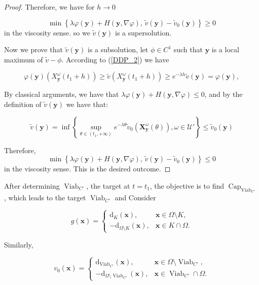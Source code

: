 \documentclass[]{interact}
\theoremstyle{plain}%
\theoremstyle{definition}
\theoremstyle{remark}
\begin{document}
\begin{proof}
Therefore, we have for $h \rightarrow 0$

\[ \min \left\{ \lambda \varphi(\mathbf{y}) + H(\mathbf{y}, \nabla \varphi), \, \tilde{v}(\mathbf{y}) - \tilde{v}_{0}(\mathbf{y}) \right\} \geq 0\]
in the viscosity sense. so we $\tilde{v}(\mathbf{y}) $  is a supersolution.

Now we prove that $\tilde{v}(\mathbf{y}) $ is a subsolution, let  \( \phi \in C^1 \) such that  $ \mathbf{y}$ is a local maximum of \( \tilde v - \phi \). According to (\ref{DDP_2}) we have 

\begin{equation}
\varphi(\mathbf{y})(X_{\mathbf{y}}^{\omega}(t_{1}+ h) ) \geq \tilde{v}(X_{\mathbf{y}}^{\omega}(t_{1}+ h) ) \geq e^{-\lambda  h } \tilde{v}(\mathbf{y})= \varphi(\mathbf{y}),
\end{equation}

By classical arguments, we have that $\lambda \varphi(\mathbf{y}) + H(\mathbf{y}, \nabla \varphi) \leq 0$, and by the definition of $\tilde{v}(\mathbf{y}) $ we have that: 

\[   \tilde{v}(\mathbf{y}) = \inf\left\{ \sup_{\theta \in (t_{1}, +\infty)} e^{-\lambda \theta} \tilde{v}_0 \left(\mathbf{X}_{\mathbf{y}}^\omega(\theta)\right), \omega \in \mathcal{U'} \right\} \leq  \tilde{v}_{0}(\mathbf{y})\]

Therefore, 
\[ \min \left\{ \lambda \varphi(\mathbf{y}) + H(\mathbf{y}, \nabla \varphi), \, \tilde{v}(\mathbf{y}) - \tilde{v}_{0}(\mathbf{y}) \right\} \leq 0\] in the viscosity sense. This is the desired outcome.


\end{proof}


After determining \(\operatorname{Viab}_{C'}\), the target at \(t = t_{1}\), the objective is to find \(\operatorname{Cap}_{\operatorname{Viab}_{C'}}\), which leads to the target \(\operatorname{Viab}_{C'}\) and  Consider 



\begin{equation}\label{g}
g(\mathbf{x}) = 
\begin{cases} 
\mathrm{d}_{K}(\mathbf{x}), & \mathbf{x} \in \Omega \setminus K, \\ 
-\mathrm{d}_{\Omega \setminus K}(\mathbf{x}), & \mathbf{x} \in K \cap \Omega.
\end{cases}
\end{equation}

Similarly, 

\begin{equation}\label{v0}
v_{0}(\mathbf{x}) = 
\begin{cases} 
\mathrm{d}_{\operatorname{Viab}_{C'}}(\mathbf{x}), & \mathbf{x} \in \Omega \setminus \operatorname{Viab}_{C'}, \\ 
-\mathrm{d}_{\Omega \setminus \operatorname{Viab}_{C'}}(\mathbf{x}), & \mathbf{x} \in \operatorname{Viab}_{C'} \cap \Omega.

\end{cases}
\end{equation}
\end{document}
